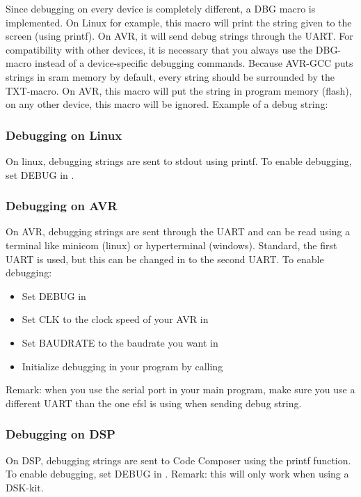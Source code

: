 Since debugging on every device is completely different, a DBG macro is 
implemented. On Linux for example, this macro will print the string given
to the screen (using printf). On AVR, it will send debug strings through the
UART. For compatibility with other devices, it is necessary that you always use
the DBG-macro instead of a device-specific debugging commands.\newline
\newline
Because AVR-GCC puts strings in sram memory by default, every string should be
surrounded by the TXT-macro. On AVR, this macro will put the string in program
memory (flash), on any other device, this macro will be ignored.\newline
\newline
Example of a debug string:\\ 

\subsubsection{Debugging on Linux}
On linux, debugging strings are sent to stdout using printf.\newline
\newline
To enable debugging, set DEBUG in .
\subsubsection{Debugging on AVR}
On AVR, debugging strings are sent through the UART and can be read using
a terminal like minicom (linux) or hyperterminal (windows). Standard, the
first UART is used, but this can be changed in  to the
second UART.\newline
\newline
To enable debugging:
\begin{itemize}
	\item{Set DEBUG in }
	\item{Set CLK to the clock speed of your AVR in }
	\item{Set BAUDRATE to the baudrate you want in }
	\item{Initialize debugging in your program by calling }
\end{itemize}
Remark: when you use the serial port in your main program, make sure you
use a different UART than the one efsl is using when sending debug string.
\subsubsection{Debugging on DSP}
On DSP, debugging strings are sent to Code Composer using the printf function.
\newline\newline
To enable debugging, set DEBUG in .\newline
\newline
Remark: this will only work when using a DSK-kit.
